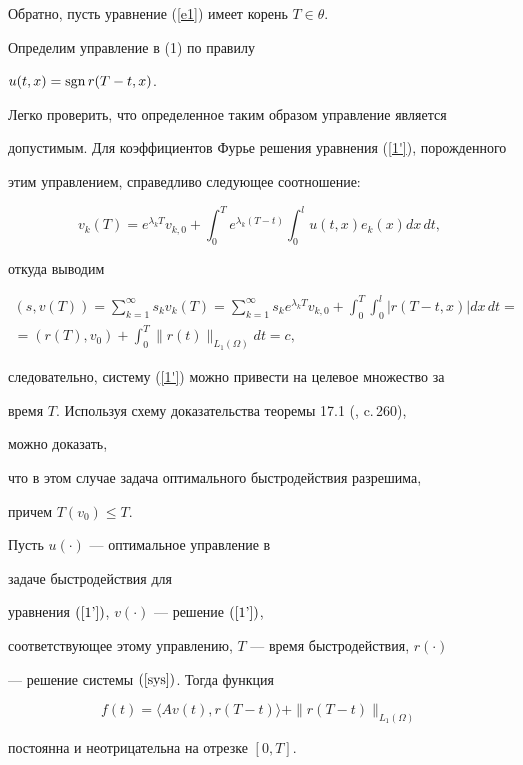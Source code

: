 \begin{pf}
Обратно, пусть уравнение (\ref{e1}) имеет корень $T\in\theta$.


Определим управление в (1) по правилу


$u(t,x)= \operatorname{sgn} r(T-t,x)$.


Легко проверить, что определенное таким образом управление является


допустимым. Для коэффициентов Фурье решения уравнения (\ref{1'}), порожденного 


этим управлением, справедливо следующее соотношение:


$$


v_k(T)= e^{\lambda_k T} v_{k,0}+


\int_0^T e^{\lambda_k (T-t)}\int_0^lu(t,x)e_k(x)dx\,dt,


$$


откуда выводим


\begin{multline*}


(s,v(T))= \sum_{k=1}^\infty  s_kv_k(T)=


\sum_{k=1}^\infty  s_k e^{\lambda_k T} v_{k,0}+


\int_0^T\int_0^l|r(T-t,x)|dx\,dt=\\


%


=(r(T),v_0)+\int_0^T\|r(t) \|_{L_1(\Omega)}  dt=c,


\end{multline*}


следовательно, систему (\ref{1'}) можно привести на целевое множество за


время $T$. Используя схему доказательства теоремы 17.1 (\cite{L}, c.\,260),


можно доказать,


что в этом случае задача оптимального быстродействия разрешима,


причем $T(v_0)\le T$. 


\end{pf}





\begin{lem}


Пусть $u (\cdot)$ --- оптимальное управление в


задаче быстродействия для 


уравнения $(\ref{1'})$, $v (\cdot) $ --- решение $(\ref{1'})$,


соответствующее этому управлению, $T$ --- время быстродействия, $r(\cdot)$


--- решение системы $(\ref{sys})$. Тогда функция


$$


f(t)=\langle Av(t),r(T-t)\rangle+\|r(T-t) \|_{L_1(\Omega)}


$$


постоянна и неотрицательна на отрезке $[0,T]$.


\end{lem}





